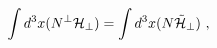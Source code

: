 \begin{equation}
\int d^3 x(N^{\perp}{\cal H}_{\perp}) =  \int d^3 x(N{\tilde{\cal H}}_{\perp}) \ ,
\label{action}
\end{equation}

